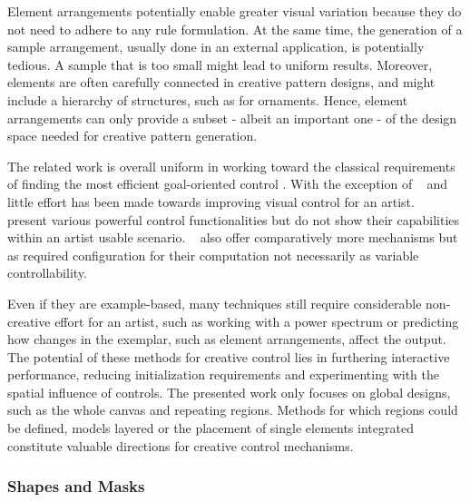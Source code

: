 Element arrangements potentially enable greater visual variation because they do not need to adhere to any rule formulation. At the same time, the generation of a sample arrangement, usually done in an external application, is potentially tedious. A sample that is too small might lead to uniform results. Moreover, elements are often carefully connected in creative pattern designs, and might include a hierarchy of structures, such as for ornaments. Hence, element arrangements can only provide a subset - albeit an important one - of the design space needed for creative pattern generation.

The related work is overall uniform in working toward the classical requirements of finding the most efficient goal-oriented control 
. With the exception of \citeauthor*{ijiri_2008_aeb}~\cite{ijiri_2008_aeb} and \citeauthor*{galerne_2012_gne}~\cite{galerne_2012_gne} little effort has been made towards improving visual control for an artist. \citeauthor*{ma_2013_det}~\cite{ma_2013_det} present various powerful control functionalities but do not show their capabilities within an artist usable scenario. \citeauthor*{gilet_2012_map}~\cite{gilet_2012_map} also offer comparatively more mechanisms but as required configuration for their computation not necessarily as variable controllability.

Even if they are example-based, many techniques still require considerable non-creative effort for an artist, such as working with a power spectrum or predicting how changes in the exemplar, such as element arrangements, affect the output. The potential of these methods for creative control lies in furthering interactive performance, reducing initialization requirements and experimenting with the spatial influence of controls. The presented work only focuses on global designs, such as the whole canvas and repeating regions. Methods for which regions could be defined, models layered or the placement of single elements integrated constitute valuable directions for creative control mechanisms.


\subsubsection{Shapes and Masks}
\label{subsubsec:analysis_creative_means_shapes}

